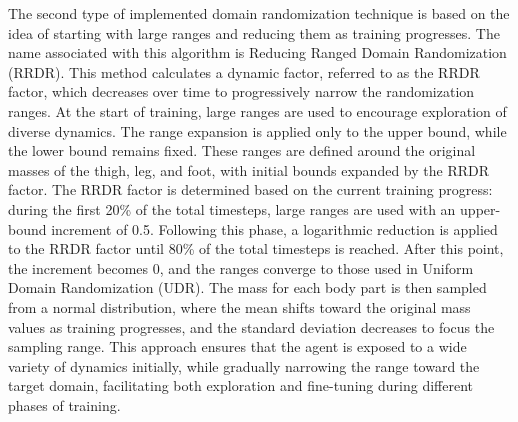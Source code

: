 \documentclass[12pt]{article}
\begin{document}
The second type of implemented domain randomization technique is based on the idea of starting with large ranges and reducing them as training progresses. The name associated with this algorithm is Reducing Ranged Domain Randomization (RRDR). This method calculates a dynamic factor, referred to as the RRDR factor, which decreases over time to progressively narrow the randomization ranges. At the start of training, large ranges are used to encourage exploration of diverse dynamics. The range expansion is applied only to the upper bound, while the lower bound remains fixed. These ranges are defined around the original masses of the thigh, leg, and foot, with initial bounds expanded by the RRDR factor. The RRDR factor is determined based on the current training progress: during the first 20\% of the total timesteps, large ranges are used with an upper-bound increment of 0.5. Following this phase, a logarithmic reduction is applied to the RRDR factor until 80\% of the total timesteps is reached. After this point, the increment becomes 0, and the ranges converge to those used in Uniform Domain Randomization (UDR). The mass for each body part is then sampled from a normal distribution, where the mean shifts toward the original mass values as training progresses, and the standard deviation decreases to focus the sampling range. This approach ensures that the agent is exposed to a wide variety of dynamics initially, while gradually narrowing the range toward the target domain, facilitating both exploration and fine-tuning during different phases of training.
\end{document}
